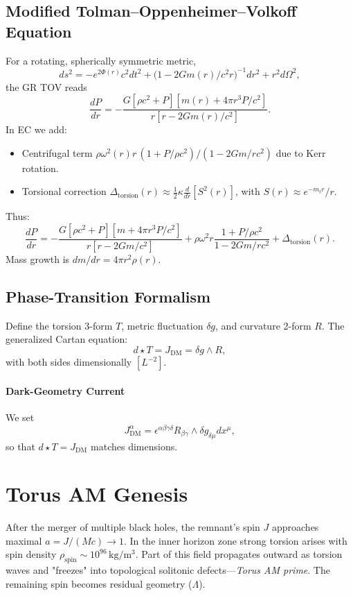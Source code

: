 \documentclass{article}
\begin{document}
\subsection{Modified Tolman–Oppenheimer–Volkoff Equation}\label{sec:modified_tov}
For a rotating, spherically symmetric metric,
\[
  ds^2 = -e^{2\Phi(r)}c^2dt^2 + \bigl(1-2Gm(r)/c^2r\bigr)^{-1}dr^2 + r^2d\Omega^2,
\]
the GR TOV reads
\[
  \frac{dP}{dr} = -\frac{G[\rho c^2 + P][m(r)+4\pi r^3P/c^2]}{r[r-2Gm(r)/c^2]}.
\]
In EC we add:
\begin{itemize}
  \item Centrifugal term $\rho\omega^2(r)r\,(1+P/\rho c^2)/(1-2Gm/rc^2)$ due to Kerr rotation.
  \item Torsional correction $\Delta_{\mathrm{torsion}}(r)\approx \tfrac12\kappa\frac{d}{dr}[S^2(r)]$, with $S(r)\approx e^{-m_tr}/r$.
\end{itemize}
Thus:
\[
  \frac{dP}{dr} = -\frac{G[\rho c^2 + P][m+4\pi r^3P/c^2]}{r[r-2Gm/c^2]}
      + \rho\omega^2r\frac{1+P/\rho c^2}{1-2Gm/rc^2}
      + \Delta_{\mathrm{torsion}}(r).
\]
Mass growth is $dm/dr=4\pi r^2\rho(r)$.

\subsection{Phase-Transition Formalism}
Define the torsion 3-form $T$, metric fluctuation $\delta g$, and curvature 2-form $R$. The generalized Cartan equation:
\[
  d\star T = J_{\mathrm{DM}} = \delta g\wedge R,
\]
with both sides dimensionally $[L^{-2}]$.

\paragraph{Dark-Geometry Current}
We set
\[
  J_{\mathrm{DM}}^\alpha = \epsilon^{\alpha\beta\gamma\delta} R_{\beta\gamma}\wedge \delta g_{\delta\mu}dx^\mu,
\]
so that $d\star T=J_{\mathrm{DM}}$ matches dimensions.  

\section{Torus AM Genesis}\label{sec:torus_am}
After the merger of multiple black holes, the remnant’s spin $J$ approaches maximal $a=J/(Mc)\to1$. In the inner horizon zone strong torsion arises with spin density $\rho_{\mathrm{spin}}\sim10^{96}\,\mathrm{kg/m^3}$. Part of this field propagates outward as torsion waves and "freezes" into topological solitonic defects—\emph{Torus AM prime}. The remaining spin becomes residual geometry ($\Lambda$).
\end{document}
